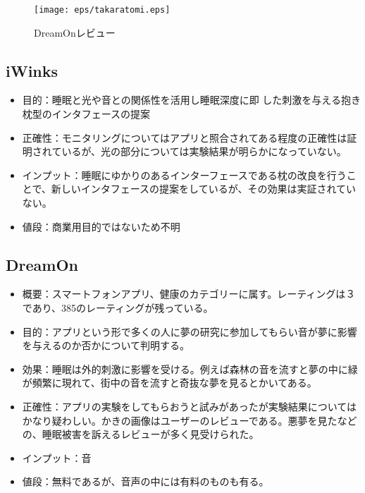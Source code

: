\begin{figure}[htbp]
\begin{center}
\texttt{[image: eps/takaratomi.eps]}
\caption{DreamOnレビュー}
\label{DreamOnレビュー}
\end{center}
\end{figure}


\subsection{iWinks}
\begin{itemize}
\item 目的：睡眠と光や音との関係性を活用し睡眠深度に即 した刺激を与える抱き枕型のインタフェースの提案 \cite{iWinks}
\item 正確性：モニタリングについてはアプリと照合されてある程度の正確性は証明されているが、光の部分については実験結果が明らかになっていない。
\item インプット：睡眠にゆかりのあるインターフェースである枕の改良を行うことで、新しいインタフェースの提案をしているが、その効果は実証されていない。
\item 値段：商業用目的ではないため不明
\end{itemize}

\subsection{DreamOn}
\begin{itemize}
\item 概要：スマートフォンアプリ、健康のカテゴリーに属す。レーティングは３であり、385のレーティングが残っている。
\item 目的：アプリという形で多くの人に夢の研究に参加してもらい音が夢に影響を与えるのか否かについて判明する。 \cite{dreamOn}
\item 効果：睡眠は外的刺激に影響を受ける。例えば森林の音を流すと夢の中に緑が頻繁に現れて、街中の音を流すと奇抜な夢を見るとかいてある。
\item 正確性：アプリの実験をしてもらおうと試みがあったが実験結果についてはかなり疑わしい。かきの画像はユーザーのレビューである。悪夢を見たなどの、睡眠被害を訴えるレビューが多く見受けられた。
\item インプット：音
\item 値段：無料であるが、音声の中には有料のものも有る。
\end{itemize}

